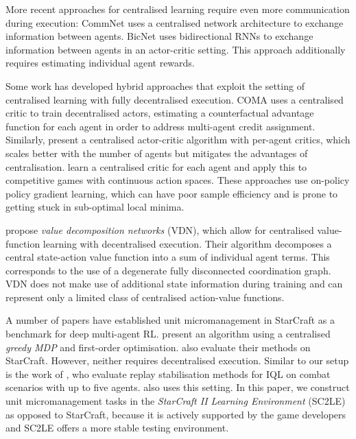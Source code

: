 \documentclass{article}
\begin{document}
More recent approaches for centralised learning require even more 
communication during execution: CommNet 
\cite{sukhbaatar_learning_2016} uses a centralised network architecture to exchange information between agents. BicNet 
\cite{peng_multiagent_2017} uses bidirectional RNNs to exchange 
information between agents in an actor-critic setting. This approach 
additionally requires estimating individual agent rewards.

Some work has developed hybrid approaches that exploit the setting of 
centralised learning with fully decentralised execution. COMA 
\cite{foerster_counterfactual_2017} uses a centralised critic to train 
decentralised actors, estimating a counterfactual advantage function for each 
agent in order to address multi-agent credit assignment. Similarly, 
\citet{gupta_cooperative_2017} present a centralised actor-critic algorithm 
with per-agent critics, which scales better with the number of agents but mitigates the
advantages of centralisation. \citet{lowe_multi-agent_2017} learn a 
centralised critic for each agent and apply this to competitive games with 
continuous action spaces. These approaches use on-policy policy gradient 
learning, which can have poor sample efficiency and is prone to getting stuck 
in sub-optimal local minima.

\citet{sunehag_value-decomposition_2017} propose \emph{value decomposition 
networks} (VDN), which allow for centralised value-function learning with 
decentralised execution. Their algorithm decomposes a central 
state-action value function into a sum of individual agent terms. This corresponds to 
the use of a degenerate fully disconnected coordination graph. VDN does not make 
use of additional state information during training and can represent only a
 limited class of centralised action-value functions.
 
A number of papers have established unit micromanagement in StarCraft as a benchmark for deep multi-agent RL. 
\citet{usunier_episodic_2016} present an algorithm using a centralised \textit{greedy MDP} and first-order optimisation. \citet{peng_multiagent_2017} also evaluate their methods on StarCraft. However, neither requires decentralised execution. 
Similar to our setup is the work of \citet{foerster_stabilising_2017}, who evaluate replay stabilisation methods for IQL on combat scenarios with up to five agents. \citet{foerster_counterfactual_2017} also uses this setting. 
In this paper, we construct unit micromanagement tasks in the \textit{StarCraft 
II Learning Environment} (SC2LE) \cite{vinyals_starcraft_2017} as opposed to 
StarCraft, because it is actively supported by the game developers and SC2LE offers a more stable testing environment. 
\end{document}

